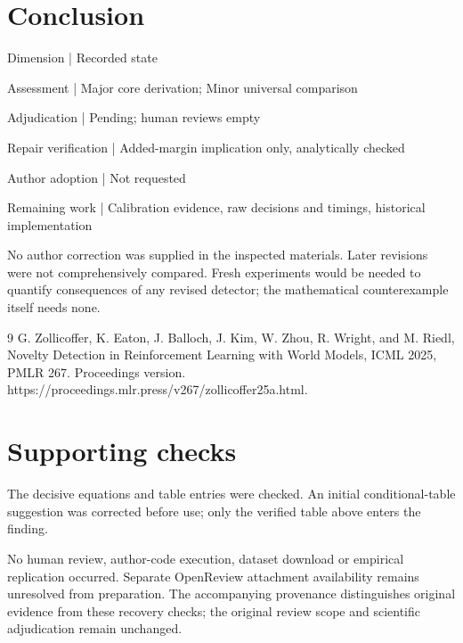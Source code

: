\documentclass[10pt]{article}
\begin{document}
\section*{Conclusion}
Dimension | Recorded state\par
Assessment | Major core derivation; Minor universal comparison\par
Adjudication | Pending; human reviews empty\par
Repair verification | Added-margin implication only, analytically checked\par
Author adoption | Not requested\par
Remaining work | Calibration evidence, raw decisions and timings, historical implementation\par
No author correction was supplied in the inspected materials. Later revisions were not comprehensively compared. Fresh experiments would be needed to quantify consequences of any revised detector; the mathematical counterexample itself needs none.\par
9 G. Zollicoffer, K. Eaton, J. Balloch, J. Kim, W. Zhou, R. Wright, and M. Riedl, Novelty Detection in Reinforcement Learning with World Models, ICML 2025, PMLR 267. Proceedings version. https://proceedings.mlr.press/v267/zollicoffer25a.html.\par
\section*{Supporting checks}
The decisive equations and table entries were checked. An initial conditional-table suggestion was corrected before use; only the verified table above enters the finding.\par
No human review, author-code execution, dataset download or empirical replication occurred. Separate OpenReview attachment availability remains unresolved from preparation. The accompanying provenance distinguishes original evidence from these recovery checks; the original review scope and scientific adjudication remain unchanged.\par
\end{document}
